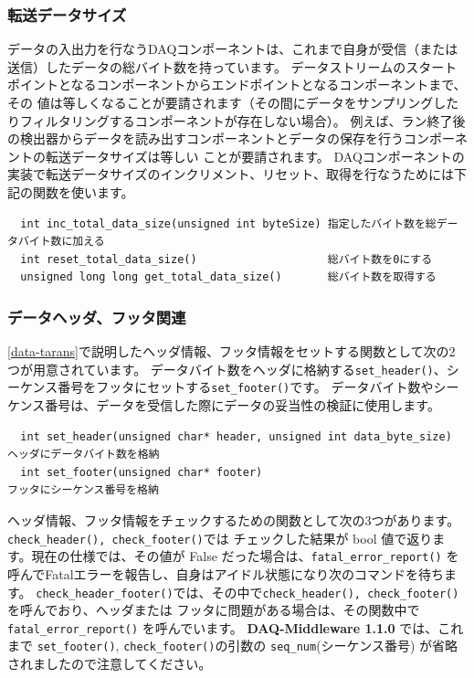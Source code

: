 \documentclass[a4j,10pt,dvips,onecolumn,oneside,final]{jarticle}%
\newcommand {\daqmwcurrent} {
	{\bf DAQ-Middleware 1.1.0}
}
\begin{document}
\subsubsection{転送データサイズ}\label{datasize}
データの入出力を行なうDAQコンポーネントは、これまで自身が受信（または送信）したデータの総バイト数を持っています。
データストリームのスタートポイントとなるコンポーネントからエンドポイントとなるコンポーネントまで、その
値は等しくなることが要請されます（その間にデータをサンプリングしたりフィルタリングするコンポーネントが存在しない場合）。
例えば、ラン終了後の検出器からデータを読み出すコンポーネントとデータの保存を行うコンポーネントの転送データサイズは等しい
ことが要請されます。
DAQコンポーネントの実装で転送データサイズのインクリメント、リセット、取得を行なうためには下記の関数を使います。
\begin{Verbatim}
  int inc_total_data_size(unsigned int byteSize) 指定したバイト数を総データバイト数に加える
  int reset_total_data_size()                    総バイト数を0にする
  unsigned long long get_total_data_size()       総バイト数を取得する
\end{Verbatim}

\subsubsection{データヘッダ、フッタ関連}\label{header}
\ref{data-tarans}で説明したヘッダ情報、フッタ情報をセットする関数として次の2つが用意されています。
データバイト数をヘッダに格納する\verb|set_header()|、シーケンス番号をフッタにセットする\verb|set_footer()|です。
データバイト数やシーケンス番号は、データを受信した際にデータの妥当性の検証に使用します。
\begin{Verbatim}
  int set_header(unsigned char* header, unsigned int data_byte_size) ヘッダにデータバイト数を格納
  int set_footer(unsigned char* footer)                              フッタにシーケンス番号を格納
\end{Verbatim}

ヘッダ情報、フッタ情報をチェックするための関数として次の3つがあります。\verb|check_header(), check_footer()|では
チェックした結果が bool 値で返ります。現在の仕様では、その値が False だった場合は、\verb|fatal_error_report()| 
を呼んでFatalエラーを報告し、自身はアイドル状態になり次のコマンドを待ちます。
\verb|check_header_footer()|では、その中で\verb|check_header(), check_footer()|を呼んでおり、ヘッダまたは
フッタに問題がある場合は、その関数中で\verb|fatal_error_report()| を呼んでいます。
{\daqmwcurrent}では、これまで \verb|set_footer()|, \verb|check_footer()|の引数の \verb|seq_num|(シーケンス番号)
が省略されましたので注意してください。
\end{document}
